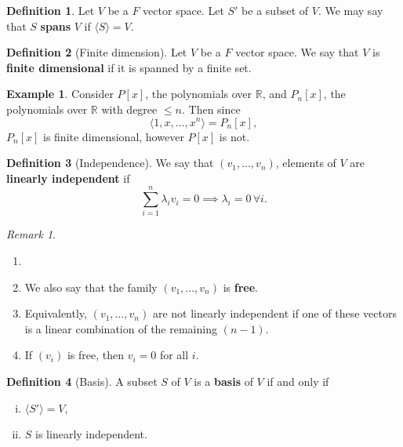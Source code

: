 \documentclass[12pt]{article}
\theoremstyle{definition}
\newtheorem{definition}{Definition}[section]
\newtheorem{example}{Example}[section]
\theoremstyle{remark}
\newtheorem*{remark}{Remark}
\begin{document}
\begin{definition}
	Let $V$ be a $F$ vector space. Let $S'$ be a subset of $V$. We may say that $S$ \textbf{spans} $V$ if $\langle S \rangle = V$.
\end{definition}

\begin{definition}[Finite dimension]
	Let $V$ be a $F$ vector space. We say that $V$ is \textbf{finite dimensional} if it is spanned by a finite set.
\end{definition}

\begin{adjustbox}{minipage = \columnwidth - 25.5pt, margin=1em, frame=1pt, margin=0em}
\begin{example}
	Consider $P[x]$, the polynomials over $\mathbb{R}$, and $P_n[x]$, the polynomials over $\mathbb{R}$ with degree $\leq n$. Then since
	\[
		\langle 1, x, \ldots, x^{n}\rangle = P_n[x]
	,\]
	$P_n[x]$ is finite dimensional, however $P[x]$ is not.
\end{example}

\end{adjustbox}

\begin{definition}[Independence]
	We say that $(v_1, \ldots, v_n)$, elements of $V$ are \textbf{linearly independent} if
	\[
	\sum_{i = 1}^{n} \lambda_i v_i = 0 \implies \lambda_i = 0 \, \forall i
	.\]
\end{definition}

\begin{remark}
	\begin{enumerate}[1.]
		\item[]
		\item We also say that the family $(v_1, \ldots, v_n)$ is \textbf{free}.
		\item Equivalently, $(v_1, \ldots, v_n)$ are not linearly independent if one of these vectors is a linear combination of the remaining $(n-1)$.
		\item If $(v_i)$ is free, then $v_i = 0$ for all $i$.
	\end{enumerate}
	
\end{remark}

\begin{definition}[Basis]
	A subset $S$ of $V$ is a \textbf{basis} of $V$ if and only if
	\begin{enumerate}[(i)]
		\item $\langle S' \rangle = V$,
		\item $S$ is linearly independent.
	\end{enumerate}
	
\end{definition}
\end{document}
